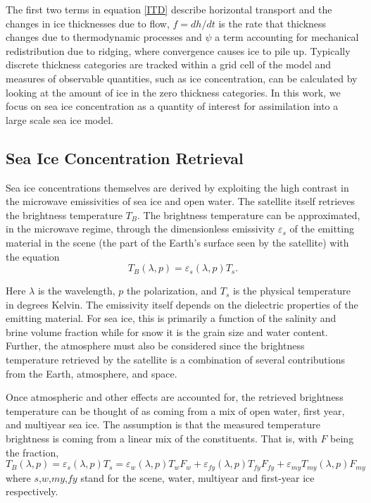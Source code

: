 \par The first two terms in equation \ref{ITD} describe horizontal transport and the changes in ice thicknesses due to flow, $f=dh/dt$ is the rate that thickness changes due to thermodynamic processes and $\psi$ a term accounting for mechanical redistribution due to ridging, where convergence causes ice to pile up. Typically discrete thickness categories are tracked within a grid cell of the model and measures of observable quantities, such as ice concentration, can be calculated by looking at the amount of ice in the zero thickness categories. In this work, we focus on sea ice concentration as a quantity of interest for assimilation into a large scale sea ice model.   

\subsection{Sea Ice Concentration Retrieval}\label{sec:IntroRetrieval}
\par Sea ice concentrations themselves are derived by exploiting the high contrast in the microwave emissivities of sea ice and open water.  The satellite itself retrieves the brightness temperature $T_B$.  The brightness temperature can be approximated, in the microwave regime, through the dimensionless emissivity $\varepsilon_s$ of the emitting material in the scene (the part of the Earth's surface seen by the satellite) with the equation 
\begin{equation} \label{TBdef}
T_B(\lambda,p)=\varepsilon_s(\lambda,p) T_s.
\end{equation}

\par Here $\lambda$ is the wavelength, $p$ the polarization, and $T_s$ is the physical temperature in degrees Kelvin. The emissivity itself depends on the dielectric properties of the emitting material. For sea ice, this is primarily a function of the salinity and brine volume fraction while for snow it is the grain size and water content. Further, the atmosphere must also be considered since the brightness temperature retrieved by the satellite is a combination of several contributions from the Earth, atmosphere, and space.  

\par Once atmospheric and other effects are accounted for, the retrieved brightness temperature can be thought of as coming from a mix of open water, first year, and multiyear sea ice.  The assumption is that the measured temperature brightness is coming from a linear mix of the constituents. That is, with $F$ being the fraction, 
\begin{equation} \label{tbcombo}
T_B(\lambda,p)=\varepsilon_s(\lambda,p)T_s=\varepsilon_{w}(\lambda,p)T_w F_w +\varepsilon_ {fy}(\lambda,p)T_{fy} F_{fy} +\varepsilon_{my}T_{my}(\lambda,p)F_{my}
\end{equation}
where $s$,$w$,$my$,$fy$ stand for the scene, water, multiyear and first-year ice respectively. 


